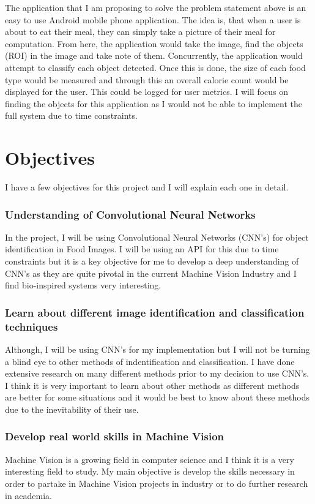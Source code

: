 The application that I am proposing to solve the problem statement above is an easy to use Android mobile phone application.
The idea is, that when a user is about to eat their meal, they can simply take a picture of their meal for computation.
From here, the application would take the image, find the objects (ROI) in the image and take note of them.
Concurrently, the application would attempt to classify each object detected.
Once this is done, the size of each food type would be measured and through this an overall calorie count would be displayed for the user.
This could be logged for user metrics. 
I will focus on finding the objects for this application as I would not be able to implement the full system due to time constraints.

\section{Objectives}
I have a few objectives for this project and I will explain each one in detail.
\subsubsection{Understanding of Convolutional Neural Networks}
In the project, I will be using Convolutional Neural Networks (CNN's) for object identification in Food Images.
I will be using an API for this due to time constraints but it is a key
objective for me to develop a deep understanding of CNN's as they are quite pivotal in the current Machine Vision Industry and I find bio-inspired systems very interesting.

\subsubsection{Learn about different image identification and classification techniques}
Although, I will be using CNN's for my implementation but I will not be turning a blind eye to other methods of indentification and classification.
I have done extensive research on many different methods prior to my decision to use CNN's.
I think it is very important to learn about other methods as different methods are better for some situations and it would be best to know about these methods due to the inevitability of their use.

\subsubsection{Develop real world skills in Machine Vision}
Machine Vision is a growing field in computer science and I think it is a very interesting field to study.
My main objective is develop the skills necessary in order to partake in Machine Vision projects in industry or to do further research in academia.

